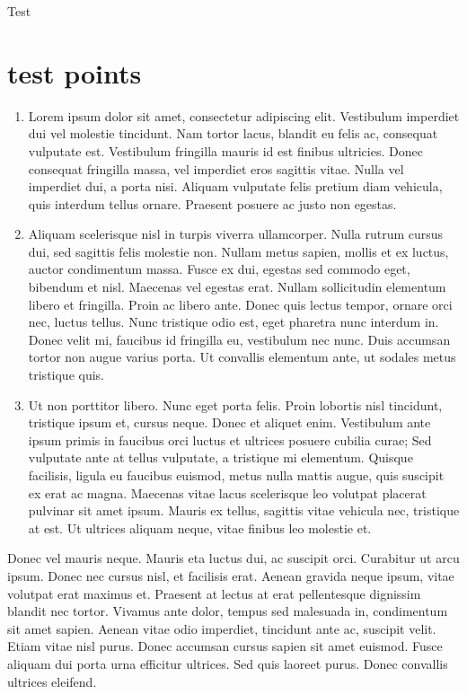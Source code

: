 \documentclass[DoubleHeader, Abgabe]{../abgaben}
\begin{document}
		
	Test
	
	\section{test \hfill points}
	
	\begin{enumerate}
		\item  Lorem ipsum dolor sit amet, consectetur adipiscing elit. Vestibulum imperdiet dui vel molestie tincidunt. Nam tortor lacus, blandit eu felis ac, consequat vulputate est. Vestibulum fringilla mauris id est finibus ultricies. Donec consequat fringilla massa, vel imperdiet eros sagittis vitae. Nulla vel imperdiet dui, a porta nisi. Aliquam vulputate felis pretium diam vehicula, quis interdum tellus ornare. Praesent posuere ac justo non egestas. 
		\item  Aliquam scelerisque nisl in turpis viverra ullamcorper. Nulla rutrum cursus dui, sed sagittis felis molestie non. Nullam metus sapien, mollis et ex luctus, auctor condimentum massa. Fusce ex dui, egestas sed commodo eget, bibendum et nisl. Maecenas vel egestas erat. Nullam sollicitudin elementum libero et fringilla. Proin ac libero ante. Donec quis lectus tempor, ornare orci nec, luctus tellus. Nunc tristique odio est, eget pharetra nunc interdum in. Donec velit mi, faucibus id fringilla eu, vestibulum nec nunc. Duis accumsan tortor non augue varius porta. Ut convallis elementum ante, ut sodales metus tristique quis. 
		\item  Ut non porttitor libero. Nunc eget porta felis. Proin lobortis nisl tincidunt, tristique ipsum et, cursus neque. Donec et aliquet enim. Vestibulum ante ipsum primis in faucibus orci luctus et ultrices posuere cubilia curae; Sed vulputate ante at tellus vulputate, a tristique mi elementum. Quisque facilisis, ligula eu faucibus euismod, metus nulla mattis augue, quis suscipit ex erat ac magna. Maecenas vitae lacus scelerisque leo volutpat placerat pulvinar sit amet ipsum. Mauris ex tellus, sagittis vitae vehicula nec, tristique at est. Ut ultrices aliquam neque, vitae finibus leo molestie et. 
	\end{enumerate}
	Donec vel mauris neque. Mauris eta luctus dui, ac suscipit orci. Curabitur ut arcu ipsum. Donec nec cursus nisl, et facilisis erat. Aenean gravida neque ipsum, vitae volutpat erat maximus et. Praesent at lectus at erat pellentesque dignissim blandit nec tortor. Vivamus ante dolor, tempus sed malesuada in, condimentum sit amet sapien. Aenean vitae odio imperdiet, tincidunt ante ac, suscipit velit. Etiam vitae nisl purus. Donec accumsan cursus sapien sit amet euismod. Fusce aliquam dui porta urna efficitur ultrices. Sed quis laoreet purus. Donec convallis ultrices eleifend. 	
\end{document}
